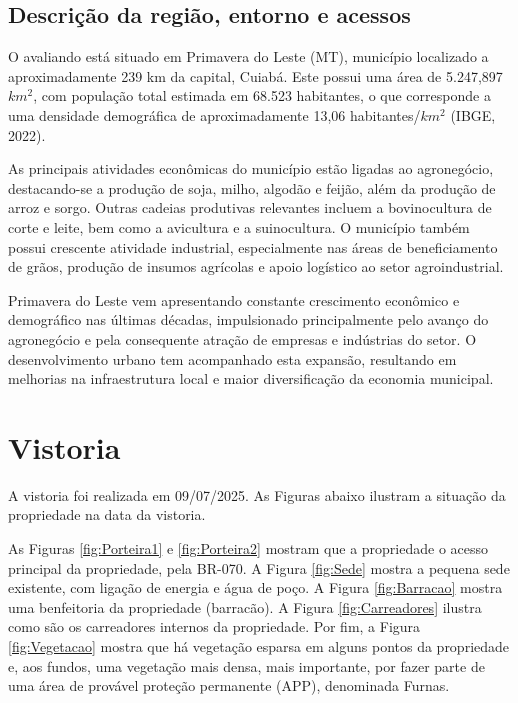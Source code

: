 \documentclass[
  10pt,
  a4paper]{article}
\begin{document}
\subsection{Descrição da região, entorno e
acessos}\label{descriuxe7uxe3o-da-regiuxe3o-entorno-e-acessos}

O avaliando está situado em Primavera do Leste (MT), município
localizado a aproximadamente 239 km da capital, Cuiabá. Este possui uma
área de 5.247,897 \(km^2\), com população total estimada em 68.523
habitantes, o que corresponde a uma densidade demográfica de
aproximadamente 13,06 habitantes/\(km^2\) (IBGE, 2022).

As principais atividades econômicas do município estão ligadas ao
agronegócio, destacando-se a produção de soja, milho, algodão e feijão,
além da produção de arroz e sorgo. Outras cadeias produtivas relevantes
incluem a bovinocultura de corte e leite, bem como a avicultura e a
suinocultura. O município também possui crescente atividade industrial,
especialmente nas áreas de beneficiamento de grãos, produção de insumos
agrícolas e apoio logístico ao setor agroindustrial.

Primavera do Leste vem apresentando constante crescimento econômico e
demográfico nas últimas décadas, impulsionado principalmente pelo avanço
do agronegócio e pela consequente atração de empresas e indústrias do
setor. O desenvolvimento urbano tem acompanhado esta expansão,
resultando em melhorias na infraestrutura local e maior diversificação
da economia municipal.

\section{Vistoria}\label{vistoria}

A vistoria foi realizada em 09/07/2025. As Figuras abaixo ilustram a
situação da propriedade na data da vistoria.

As Figuras \ref{fig:Porteira1} e \ref{fig:Porteira2} mostram que a
propriedade o acesso principal da propriedade, pela BR-070. A Figura
\ref{fig:Sede} mostra a pequena sede existente, com ligação de energia e
água de poço. A Figura \ref{fig:Barracao} mostra uma benfeitoria da
propriedade (barracão). A Figura \ref{fig:Carreadores} ilustra como são
os carreadores internos da propriedade. Por fim, a Figura
\ref{fig:Vegetacao} mostra que há vegetação esparsa em alguns pontos da
propriedade e, aos fundos, uma vegetação mais densa, mais importante,
por fazer parte de uma área de provável proteção permanente (APP),
denominada Furnas.
\end{document}
